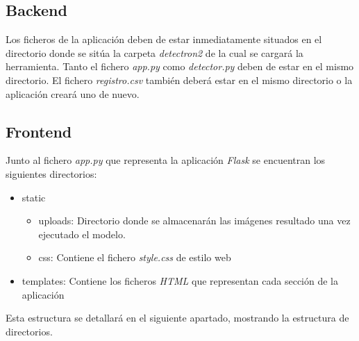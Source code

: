 \subsection{Backend}
Los ficheros de la aplicación deben de estar inmediatamente situados en el directorio donde se sitúa la carpeta \emph{detectron2} de la cual se cargará la herramienta. Tanto el fichero \emph{app.py} como \emph{detector.py} deben de estar en el mismo directorio. El fichero \emph{registro.csv} también deberá estar en el mismo directorio o la aplicación creará uno de nuevo.

\subsection{Frontend}
Junto al fichero \emph{app.py} que representa la aplicación \emph{Flask} se encuentran los siguientes directorios:

\begin{itemize}
    \item static
        \begin{itemize}
            \item uploads: Directorio donde se almacenarán las imágenes resultado una vez ejecutado el modelo.
            \item css: Contiene el fichero \emph{style.css} de estilo web 
        \end{itemize}
    \item templates: Contiene los ficheros \emph{HTML} que representan cada sección de la aplicación
\end{itemize}

Esta estructura se detallará en el siguiente apartado, mostrando la estructura de directorios.
